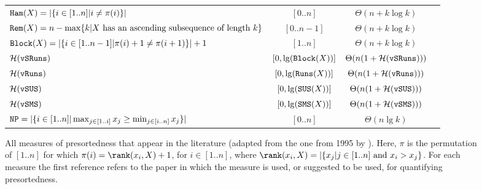 \begin{figure}
\begin{tabular}{l|c|c|c}
$\mathtt{Ham}(X)=|\{i\in[1..n] | i\neq\pi(i)\}|$  & $[0..n]$ &$\Theta(n + k\log k)$&\cite{} \\
$\mathtt{Rem}(X)=n-\max\{k|X\mbox{ has an ascending subsequence of length $k$}\}$  & $[0..n-1]$ &$\Theta(n + k\log k)$&\cite{} \\
$\mathtt{Block}(X)=|\{i\in[1..n-1] | \pi(i)+1 \neq \pi(i+1)\}|+1$  & $[1..n]$ &$\Theta(n + k\log k)$&\cite{1993-Algoritmica-SulinearMergingAndnaturalMergeSort-CarlssonLevcopoulosPetersson} \\
\hline
${\cal H}(\mathtt{vSRuns})$  & $[0,\lg(\mathtt{Block}(X))]$ & $\Theta(n(1+{\cal H}(\mathtt{vSRuns})))$ & \cite{2009-STACS-CompressedRepresentationsOfPermutationsAndApplications-BarbayNavarro,2013-TCS-CompressedRepresentationsOfPermutationsAndApplications-BarbayNavarro} \\
${\cal H}(\mathtt{vRuns})$  & $[0,\lg(\mathtt{Runs}(X))]$ & $\Theta(n(1+{\cal H}(\mathtt{vRuns})))$ & \cite{2009-STACS-CompressedRepresentationsOfPermutationsAndApplications-BarbayNavarro,2013-TCS-CompressedRepresentationsOfPermutationsAndApplications-BarbayNavarro} \\
${\cal H}(\mathtt{vSUS})$  & $[0,\lg(\mathtt{SUS}(X))]$ & $\Theta(n(1+{\cal H}(\mathtt{vSUS})))$ & \cite{2009-STACS-CompressedRepresentationsOfPermutationsAndApplications-BarbayNavarro,2013-TCS-CompressedRepresentationsOfPermutationsAndApplications-BarbayNavarro} \\
${\cal H}(\mathtt{vSMS})$  & $[0,\lg(\mathtt{SMS}(X))]$ & $\Theta(n(1+{\cal H}(\mathtt{vSMS})))$ &   
\cite{2009-STACS-CompressedRepresentationsOfPermutationsAndApplications-BarbayNavarro,2013-TCS-CompressedRepresentationsOfPermutationsAndApplications-BarbayNavarro} \\
\hline
$\mathtt{NP}= |\{ i\in[1..n] | \max_{j\in[1..i]}x_j \geq \min_{j\in[i..n]}x_j\}|$  & $[0..n]$ & $\Theta(n\lg k)$ & \cite{2016-ARXIV-SynergisticSortingAndDeferredDataStructuresOnMultiSets-BarbayOchoaRao} \\

\end{tabular}
\caption{All measures of presortedness that appear in the literature (adapted from the one from 1995 by \textcite{1995-DAM-AFrameworkForAdaptiveSorting-PeterssonMoffat}). Here, $\pi$ is the permutation of $[1..n]$ for which $\pi(i)=\rank(x_i,X)+1$, for $i\in[1..n]$, where $\rank(x_i,X)=|\{ x_j | j\in[1..n] \mbox{ and } x_i>x_j\}$. For each measure the first reference refers to the paper in which the measure is used, or suggested to be used, for quantifying presortedness.}
\label{fig:DefinitionsOfMeasuresOfDisorder}
\end{figure}

